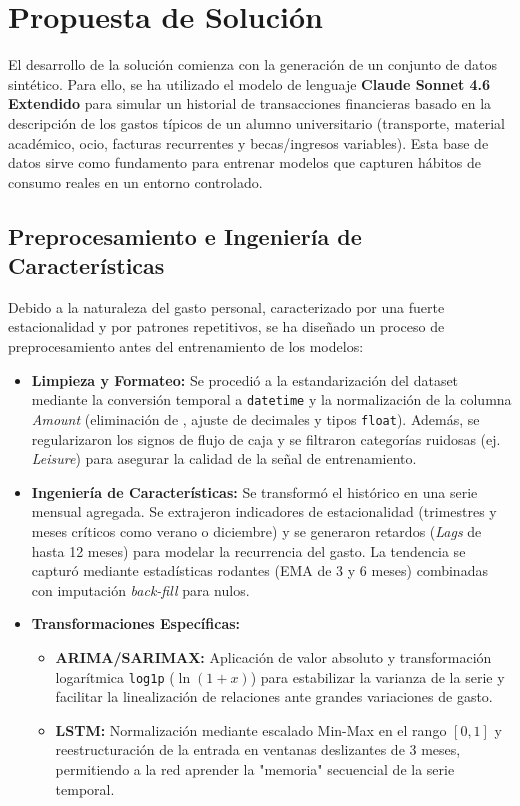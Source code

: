 \section{Propuesta de Solución}

El desarrollo de la solución comienza con la generación de un conjunto de datos sintético. Para ello, se ha utilizado el modelo de lenguaje \textbf{Claude Sonnet 4.6 Extendido} para simular un historial de transacciones financieras basado en la descripción de los gastos típicos de un alumno universitario (transporte, material académico, ocio, facturas recurrentes y becas/ingresos variables). Esta base de datos sirve como fundamento para entrenar modelos que capturen hábitos de consumo reales en un entorno controlado.

\subsection{Preprocesamiento e Ingeniería de Características}
Debido a la naturaleza del gasto personal, caracterizado por una fuerte estacionalidad y por patrones repetitivos, se ha diseñado un proceso de preprocesamiento antes del entrenamiento de los modelos:

\begin{itemize}
    \item \textbf{Limpieza y Formateo:} Se procedió a la estandarización del dataset mediante la conversión temporal a \texttt{datetime} y la normalización de la columna \textit{Amount} (eliminación de \texteuro{}, ajuste de decimales y tipos \texttt{float}). Además, se regularizaron los signos de flujo de caja y se filtraron categorías ruidosas (ej. \textit{Leisure}) para asegurar la calidad de la señal de entrenamiento.

    \item \textbf{Ingeniería de Características:} Se transformó el histórico en una serie mensual agregada. Se extrajeron indicadores de estacionalidad (trimestres y meses críticos como verano o diciembre) y se generaron retardos (\textit{Lags} de hasta 12 meses) para modelar la recurrencia del gasto. La tendencia se capturó mediante estadísticas rodantes (EMA de 3 y 6 meses) combinadas con imputación \textit{back-fill} para nulos.

    \item \textbf{Transformaciones Específicas:}
    \begin{itemize}
        \item \textbf{ARIMA/SARIMAX:} Aplicación de valor absoluto y transformación logarítmica \texttt{log1p} ($\ln(1+x)$) para estabilizar la varianza de la serie y facilitar la linealización de relaciones ante grandes variaciones de gasto.
        \item \textbf{LSTM:} Normalización mediante escalado Min-Max en el rango $[0, 1]$ y reestructuración de la entrada en ventanas deslizantes de 3 meses, permitiendo a la red aprender la "memoria" secuencial de la serie temporal.
    \end{itemize}
\end{itemize}

